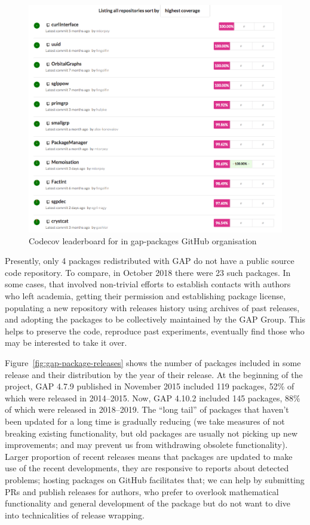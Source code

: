 \documentclass{deliverablereport}
\begin{document}
\begin{figure}[!ht]
    \centering
    \includegraphics[width=\textwidth]{images/gap-packages-codecov}
    \caption{Codecov leaderboard for in gap-packages GitHub organisation}
    \label{fig:gap-packages-codecov}
\end{figure}

Presently, only 4 packages redistributed with GAP do not have a public 
source code repository. To compare, in October 2018 there were 23 such 
packages. In some cases, that involved non-trivial efforts to establish 
contacts with authors who left academia, getting their permission and 
establishing package license, populating a new repository with releases 
history using archives of past releases, and adopting the packages to
be collectively maintained by the GAP Group. This helps to preserve the
code, reproduce past experiments, eventually find those who may be interested
to take it over.

Figure~\ref{fig:gap-package-releases} shows the number of \GAP packages
included in some \GAP release and their distribution by the year of their
release. At the beginning of the project, GAP 4.7.9 published in November
2015 included 119 packages, 52\% of which were released in 2014--2015.
Now, GAP 4.10.2 included 145 packages, 88\% of which were released in
2018--2019. The ``long tail'' of packages that haven't been updated for
a long time is gradually reducing (we take measures of not breaking
existing functionality, but old packages are usually not picking up
new improvements; and may prevent us from withdrawing obsolete
functionality). Larger proportion of recent releases means that 
packages are updated to make use of the recent \GAP developments,
they are responsive to reports about detected problems; hosting packages on GitHub
facilitates that; we can help by submitting PRs and publish releases for authors,
who prefer to overlook mathematical functionality and general development of the
package but do not want to dive into technicalities of release wrapping.
\end{document}
